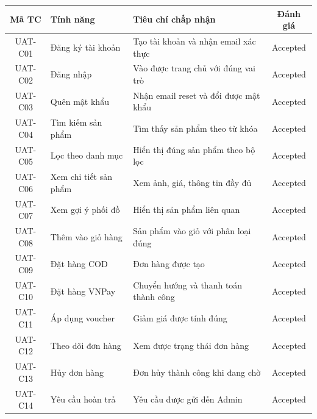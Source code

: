 \begin{table}[H]
  \centering
  \renewcommand{\arraystretch}{1.3}
  \begin{tabular}{|c|p{3.5cm}|p{4.8cm}|c|}
    \hline
    \textbf{Mã TC} & \textbf{Tính năng}        & \textbf{Tiêu chí chấp nhận}           & \textbf{Đánh giá} \\
    \hline
    UAT-C01        & Đăng ký tài khoản         & Tạo tài khoản và nhận email xác thực  & Accepted          \\
    \hline
    UAT-C02        & Đăng nhập                 & Vào được trang chủ với đúng vai trò   & Accepted          \\
    \hline
    UAT-C03        & Quên mật khẩu             & Nhận email reset và đổi được mật khẩu & Accepted          \\
    \hline
    UAT-C04        & Tìm kiếm sản phẩm         & Tìm thấy sản phẩm theo từ khóa        & Accepted          \\
    \hline
    UAT-C05        & Lọc theo danh mục         & Hiển thị đúng sản phẩm theo bộ lọc    & Accepted          \\
    \hline
    UAT-C06        & Xem chi tiết sản phẩm     & Xem ảnh, giá, thông tin đầy đủ        & Accepted          \\
    \hline
    UAT-C07        & Xem gợi ý phối đồ         & Hiển thị sản phẩm liên quan           & Accepted          \\
    \hline
    UAT-C08        & Thêm vào giỏ hàng         & Sản phẩm vào giỏ với phân loại đúng   & Accepted          \\
    \hline
    UAT-C09        & Đặt hàng COD              & Đơn hàng được tạo                     & Accepted          \\
    \hline
    UAT-C10        & Đặt hàng VNPay            & Chuyển hướng và thanh toán thành công & Accepted          \\
    \hline
    UAT-C11        & Áp dụng voucher           & Giảm giá được tính đúng               & Accepted          \\
    \hline
    UAT-C12        & Theo dõi đơn hàng         & Xem được trạng thái đơn hàng          & Accepted          \\
    \hline
    UAT-C13        & Hủy đơn hàng              & Đơn hủy thành công khi đang chờ       & Accepted          \\
    \hline
    UAT-C14        & Yêu cầu hoàn trả          & Yêu cầu được gửi đến Admin            & Accepted          \\

\end{tabular}
\end{table}
